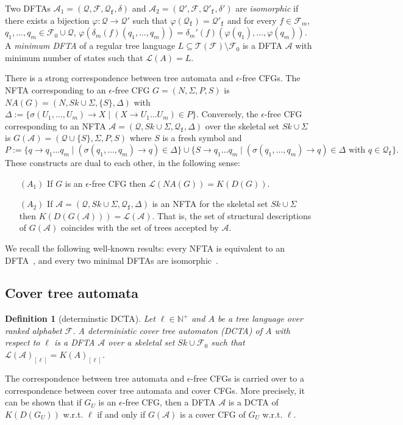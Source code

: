 \documentclass[preprint,12pt,english]{article}
\def\cA{\mathcal{A}}
\def\cF{\mathcal{F}}
\def\cL{\mathcal{L}}
\def\cT{\mathcal{T}}
\def\cQ{\mathcal{Q}}
\newtheorem{definition}{Definition}
\begin{document}
Two DFTAs $\cA_1=(\cQ,\cF,\cQ_{\mathtt{f}},\delta)$ and $\cA_2=(\cQ',\cF,\cQ'_{\mathtt{f}},\delta')$ are {\em isomorphic} if there exists a bijection $\varphi:\cQ\to \cQ'$ such that $\varphi(\cQ_{\mathtt{f}})=\cQ'_{\mathtt{f}}$ and for every $f\in\cF_m$, $q_1,\ldots,q_m\in\cF_0\cup\cQ$, $\varphi(\delta_m(f)(q_1,\ldots,q_m))=\delta_m'(f)(\varphi(q_1),\ldots,\varphi(q_m)).$ A {\em minimum DFTA} of a regular tree language $L\subseteq\cT(\cF)\setminus\cF_0$ is a DFTA $\cA$ with minimum number of states such that $\cL(A)=L.$

There is a strong correspondence between tree automata and $\epsilon$-free CFGs.
The NFTA corresponding to an $\epsilon$-free CFG $G=(N,\Sigma,P,S)$ is $NA(G)=(N,Sk\cup\Sigma,\{S\},\Delta)$ with 
$\Delta:=\{\sigma(U_1,\ldots,U_m)\to X\mid (X\to U_1\ldots U_m)\in P\}.$
Conversely, the $\epsilon$-free CFG corresponding to an NFTA $\cA=(\cQ,Sk\cup\Sigma,\cQ_{\mathtt{f}},\Delta)$ over the skeletal set $Sk\cup\Sigma$ is $G(\cA)=(\cQ\cup\{S\},\Sigma,P,S)$ where $S$ is a fresh symbol and 
$P:=\{q\to q_1\ldots q_m\mid (\sigma(q_1,\ldots,q_m)\to q)\in\Delta\}\cup \{S\to q_1\ldots q_m\mid (\sigma(q_1,\ldots,q_m)\to q)\in\Delta\text{ with }q\in \cQ_{\mathtt{f}}\}.
$
These  constructs are dual to each other, in the following sense:
\begin{enumerate}
\item[$(A_1)$] If $G$ is an $\epsilon$-free CFG then $\cL(NA(G))=K(D(G))$. \hfill \cite[Prop. 3.4]{Sak:1990}
\item[$(A_2)$] If $\cA=(\cQ,Sk\cup\Sigma,\cQ_{\mathtt{f}},\Delta)$ is an NFTA for the skeletal set $Sk\cup\Sigma$ then $K(D(G(\cA)))=\cL(\cA)$. That is, the set of structural descriptions of $G(\cA)$ coincides with the set of trees accepted by $\cA$. \hfill\cite[Prop. 3.6]{Sak:1990}
\end{enumerate}
We recall the following well-known results: 
every NFTA is equivalent to an DFTA~\cite{LJ:1978}, and every two minimal DFTAs are isomorphic~\cite{Brainerd:68}.

\subsection*{Cover tree automata}

\begin{definition}[determinstic DCTA]
Let $\ell\in\mathbb{N}^+$ and $A$ be a tree language over ranked alphabet $\cF$.
A {\em deterministic cover tree automaton} (DCTA) of  $A$ with respect to $\ell$ is a DFTA $\cA$ over a skeletal set $Sk\cup\cF_0$ such that $\cL(\cA)_{[\ell]}=K(A)_{[\ell]}$. 
\end{definition}
The correspondence between tree automata and $\epsilon$-free CFGs is carried over to a  correspondence between cover tree automata and cover CFGs. More precisely, it can be shown that if $G_U$ is an $\epsilon$-free CFG, then a DFTA $\cA$ is a DCTA of $K(D(G_U))$ w.r.t. $\ell$ if and only if $G(\cA)$ is a cover CFG of $G_U$ w.r.t. $\ell$.
\end{document}
